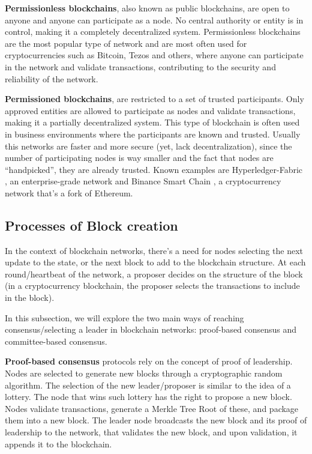 \textbf{Permissionless blockchains}, also known as public blockchains, are open to anyone and anyone can participate as a node. No central authority or entity is in control, making it a completely decentralized system. Permissionless blockchains are the most popular type of network and are most often used for cryptocurrencies such as Bitcoin, Tezos and others, where anyone can participate in the network and validate transactions, contributing to the security and reliability of the network.

\textbf{Permissioned blockchains}, are restricted to a set of trusted participants. Only approved entities are allowed to participate as nodes and validate transactions, making it a partially decentralized system. This type of blockchain is often used in business environments where the participants are known and trusted. Usually this networks are faster and more secure (yet, lack decentralization), since the number of participating nodes is way smaller and the fact that nodes are ``handpicked'', they are already trusted.
Known examples are Hyperledger-Fabric \cite{androulaki2018hyperledger}, an enterprise-grade network and Binance Smart Chain \cite{bnb-chain_2022}, a cryptocurrency network that's a fork of Ethereum.

\subsection*{Processes of Block creation}
In the context of blockchain networks, there's a need for nodes selecting the next update to the state, or the next block to add to the blockchain structure. At each round/heartbeat of the network, a proposer decides on the structure of the block (in a cryptocurrency blockchain, the proposer selects the transactions to include in the block).

In this subsection, we will explore the two main ways of reaching consensus/selecting a leader in blockchain networks: proof-based consensus and committee-based consensus.

\textbf{Proof-based consensus} protocols rely on the concept of proof of leadership. Nodes are selected to generate new blocks through a cryptographic random algorithm. The selection of the new leader/proposer is similar to the idea of a lottery. The node that wins such lottery has the right to propose a new block.
Nodes validate transactions, generate a Merkle Tree Root of these, and package them into a new block. The leader node broadcasts the new block and its proof of leadership to the network, that validates the new block, and upon validation, it appends it to the blockchain.


